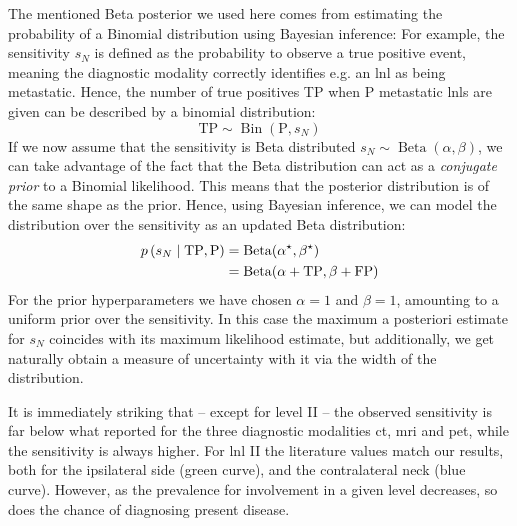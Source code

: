 \documentclass[\relativeRoot/main.tex]{subfiles}
\begin{document}
\begin{tcolorbox}[title=\faIcon{lightbulb} Beta posterior, parbox=false]

    The mentioned Beta posterior we used here comes from estimating the probability of a Binomial distribution using Bayesian inference: For example, the sensitivity $s_N$ is defined as the probability to observe a true positive event, meaning the diagnostic modality correctly identifies e.g. an \gls{lnl} as being metastatic. Hence, the number of true positives TP when P metastatic \glspl{lnl} are given can be described by a binomial distribution:
    \begin{equation}
        \text{TP} \sim \operatorname{Bin}(\text{P}, s_N)
    \end{equation}
    If we now assume that the sensitivity is Beta distributed $s_N \sim \operatorname{Beta}(\alpha, \beta)$, we can take advantage of the fact that the Beta distribution can act as a \emph{conjugate prior} to a Binomial likelihood. This means that the posterior distribution is of the same shape as the prior. Hence, using Bayesian inference, we can model the distribution over the sensitivity as an updated Beta distribution:
    \begin{equation}
        \begin{aligned}
            p \left( s_N \mid \text{TP},\text{P} \right) &= \operatorname{Beta}(\alpha^\star, \beta^\star) \\
            &= \operatorname{Beta}(\alpha + \text{TP}, \beta + \text{FP})
        \end{aligned}
    \end{equation}
    For the prior hyperparameters we have chosen $\alpha=1$ and $\beta=1$, amounting to a uniform prior over the sensitivity. In this case the maximum a posteriori estimate for $s_N$ coincides with its maximum likelihood estimate, but additionally, we get naturally obtain a measure of uncertainty with it via the width of the distribution.

\end{tcolorbox}

It is immediately striking that -- except for level II -- the observed sensitivity is far below what  reported for the three diagnostic modalities \gls{ct}, \gls{mri} and \gls{pet}, while the sensitivity is always higher. For \gls{lnl} II the literature values match our results, both for the ipsilateral side (green curve), and the contralateral neck (blue curve). However, as the prevalence for involvement in a given level decreases, so does the chance of diagnosing present disease.
\end{document}

